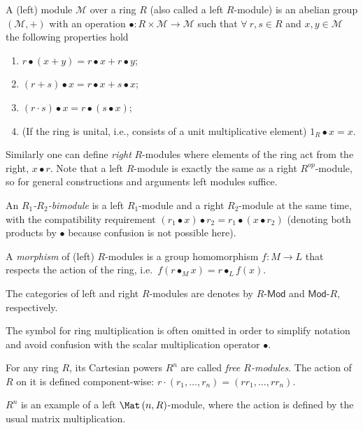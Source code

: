 %
\begin{defn}
A (left) module $\mathcal{M}$ over a ring $R$ (also called a left
$R$-module) is an abelian group $(\mathcal{M},+)$ with an operation
$\bullet:R\times\mathcal{M}\rightarrow\mathcal{M}$ such that $\forall~r,s\in R$
and $x,y\in\mathcal{M}$ the following properties hold 
\begin{enumerate}
\item $r\bullet(x+y)=r\bullet x+r\bullet y$;
\item $(r+s)\bullet x=r\bullet x+s\bullet x$;
\item $(r\cdot s)\bullet x=r\bullet(s\bullet x)$;
\item (If the ring is unital, i.e., consists of a unit multiplicative element)
$1_{R}\bullet x=x$. 
\end{enumerate}
Similarly one can define \emph{right} $R$-modules where elements
of the ring act from the right, $x\bullet r$. Note that a left $R$-module
is exactly the same as a right $R^{op}$-module, so for general constructions
and arguments left modules suffice.

An $R_{1}$\emph{-$R_{2}$-bimodule} is a left $R_{1}$-module and
a right $R_{2}$-module at the same time, with the compatibility requirement
$\left(r_{1}\bullet x\right)\bullet r_{2}=r_{1}\bullet\left(x\bullet r_{2}\right)$
(denoting both products by $\bullet$ because confusion is not possible
here).

A \emph{morphism} of (left) $R$-modules is a group homomorphism
$f:M\to L$ that respects the action of the ring, i.e.\ $f\left(r\bullet_{M}x\right)=r\bullet_{L}f\left(x\right)$.

The categories of left and right $R$-modules are denotes by $R\text{-}\mathsf{Mod}$
and $\mathsf{Mod}\text{-}R$, respectively.
\end{defn}
The symbol for ring multiplication is often omitted in order to simplify
notation and avoid confusion with the scalar multiplication operator
$\bullet$.
\begin{example}
For any ring $R$, its Cartesian powers $R^{n}$ are called \emph{free
$R$-modules}. The action of $R$ on it is defined component-wise:
$r\cdot\left(r_{1},\ldots,r_{n}\right)=\left(rr_{1},\ldots,rr_{n}\right)$.
\end{example}
%
\begin{example}
$R^{n}$ is an example of a left $\Mat\left(n,R\right)$-module,
where the action is defined by the usual matrix multiplication.
\end{example}
